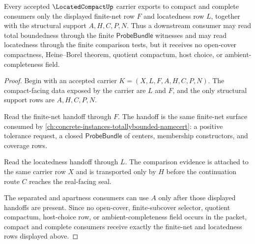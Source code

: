 \begin{theorem}
\label{thm:located-compact-totally-bounded-handoff}
Every accepted $\LocatedCompactUp$ carrier exports to compact and complete consumers only the displayed finite-net row $F$ and locatedness row $L$, together with the structural support $A,H,C,P,N$. Thus a downstream consumer may read total boundedness through the finite $\mathsf{ProbeBundle}$ witnesses and may read locatedness through the finite comparison tests, but it receives no open-cover compactness, Heine--Borel theorem, quotient compactum, host choice, or ambient-completeness field.
\end{theorem}
\begin{proof}
Begin with an accepted carrier $K=(X,L,F,A,H,C,P,N)$. The compact-facing data exposed by the carrier are $L$ and $F$, and the only structural support rows are $A,H,C,P,N$.

Read the finite-net handoff through $F$. The handoff is the same finite-net surface consumed by \autoref{ch:concrete-instances-totallybounded-namecert}: a positive tolerance request, a closed $\mathsf{ProbeBundle}$ of centers, membership constructors, and coverage rows.

Read the locatedness handoff through $L$. The comparison evidence is attached to the same carrier row $X$ and is transported only by $H$ before the continuation route $C$ reaches the real-facing seal.

The separated and apartness consumers can use $A$ only after those displayed handoffs are present. Since no open-cover, finite-subcover selector, quotient compactum, host-choice row, or ambient-completeness field occurs in the packet, compact and complete consumers receive exactly the finite-net and locatedness rows displayed above.
\end{proof}

